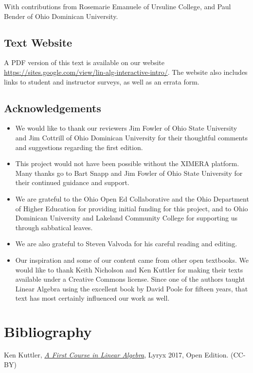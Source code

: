 \documentclass{ximera}
\begin{document}
With contributions from Rosemarie Emanuele of Ursuline College, and Paul Bender of Ohio Dominican University.

\subsection{Text Website}
A PDF version of this text is available on our website \href{https://sites.google.com/view/lin-alg-interactive-intro/}{https://sites.google.com/view/lin-alg-interactive-intro/}.  The website also includes links to student and instructor surveys, as well as an errata form.

\subsection{Acknowledgements}
\begin{itemize}
\item
We would like to thank our reviewers Jim Fowler of Ohio State University and Jim Cottrill of Ohio Dominican University for their thoughtful comments and suggestions regarding the first edition.  
\item This project would not have been possible without the XIMERA platform.  Many thanks go to Bart Snapp and Jim Fowler of Ohio State University for their continued guidance and support.   
\item We are grateful to the Ohio Open Ed Collaborative and the Ohio Department of Higher Education for providing initial funding for this project, and to Ohio Dominican University and Lakeland Community College for supporting us through sabbatical leaves.
\item We are also grateful to Steven Valvoda for his careful reading and editing.
\item Our inspiration and some of our content came from other open textbooks. We would like to thank Keith Nicholson and Ken Kuttler for making their texts available under a Creative Commons license.  Since one of the authors taught Linear Algebra using the excellent book by David Poole for fifteen years, that text has most certainly influenced our work as well.
\end{itemize}

\section*{Bibliography}

Ken Kuttler, \href{https://open.umn.edu/opentextbooks/textbooks/a-first-course-in-linear-algebra-2017}{\it A First Course in Linear Algebra}, Lyryx 2017, Open Edition. (CC-BY)
\end{document}
